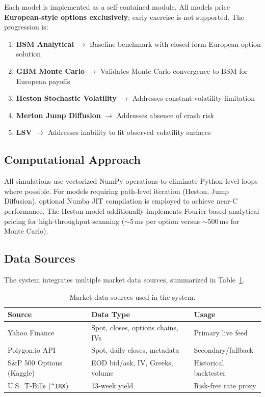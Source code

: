 \documentclass[12pt,a4paper]{article}
\begin{document}
Each model is implemented as a self-contained module. All models price \textbf{European-style options exclusively}; early exercise is not supported. The progression is:
\begin{enumerate}
\item \textbf{BSM Analytical} $\rightarrow$ Baseline benchmark with closed-form European option solution
\item \textbf{GBM Monte Carlo} $\rightarrow$ Validates Monte Carlo convergence to BSM for European payoffs
\item \textbf{Heston Stochastic Volatility} $\rightarrow$ Addresses constant-volatility limitation
\item \textbf{Merton Jump Diffusion} $\rightarrow$ Addresses absence of crash risk
\item \textbf{LSV} $\rightarrow$ Addresses inability to fit observed volatility surfaces
\end{enumerate}

\subsection{Computational Approach}

All simulations use vectorized NumPy operations to eliminate Python-level loops where possible. For models requiring path-level iteration (Heston, Jump Diffusion), optional Numba JIT compilation is employed to achieve near-C performance. The Heston model additionally implements Fourier-based analytical pricing for high-throughput scanning (${\sim}5$\,ms per option versus ${\sim}500$\,ms for Monte Carlo).

\subsection{Data Sources}

The system integrates multiple market data sources, summarized in Table~\ref{tab:datasources}.

\begin{table}[H]
\centering
\caption{Market data sources used in the system.}
\label{tab:datasources}
\begin{tabular}{@{}lll@{}}
\toprule
\textbf{Source} & \textbf{Data Type} & \textbf{Usage} \\
\midrule
Yahoo Finance & Spot, closes, options chains, IVs & Primary live feed \parencite{yahoo} \\
Polygon.io API & Spot, daily closes, metadata & Secondary/fallback \parencite{polygon} \\
S\&P 500 Options (Kaggle) & EOD bid/ask, IV, Greeks, volume & Historical backtester \parencite{singh2024} \\
U.S.\ T-Bills (\texttt{\^{}IRX}) & 13-week yield & Risk-free rate proxy \\
\bottomrule
\end{tabular}
\end{table}
\end{document}
